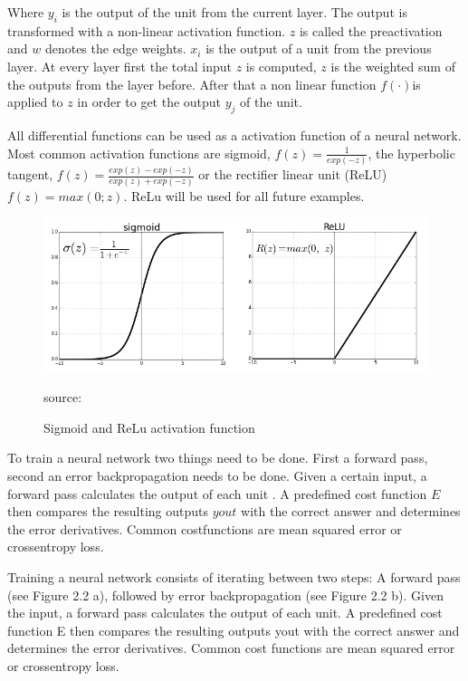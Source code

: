Where \( y_{i} \) is the output of the unit from the current layer. The output is transformed with a non-linear activation function. \(z\) is called the preactivation and \(w\) denotes the edge weights. \( x_{i} \) is the output of a unit from the previous layer. At every layer first the total input \(z\) is computed, \(z\) is the weighted sum of the outputs from the layer before. After that a non linear function \( f(\cdot) \)is applied to \(z\) in order to get the output \( y_{j} \) of the unit. 

All differential functions can be used as a activation function of a neural network. Most common activation functions are sigmoid,  \(f(z) = \frac{1}{exp(-z)}\), the hyperbolic tangent, \(f(z) = \frac{exp(z)-exp(-z)}{exp(z)+exp(-z)}\) or the rectifier linear unit (ReLU) \(f(z) = max(0; z)\). ReLu will be used for all future examples.


\begin{figure}[H]
	\centering
	\includegraphics[width=0.8\linewidth]{bilder/grundlagen/sigmoid.png}
	\caption{Sigmoid and ReLu activation function} source:\cite{Component}
	\label{fig:COMPONENT}
\end{figure}



To train a neural network two things need to be done. First a forward pass, second an error backpropagation needs to be done. 
Given a certain input, a forward pass calculates the output of each unit . A predefined cost function \(E\) then compares the resulting outputs \(yout\) with the correct answer and determines the error derivatives. Common costfunctions are mean squared error or crossentropy loss.


Training a neural network consists of iterating between two steps: A forward pass (see
Figure 2.2 a), followed by error backpropagation (see Figure 2.2 b). Given the input, a forward
pass calculates the output of each unit. A predefined cost function E then compares
the resulting outputs yout with the correct answer and determines the error derivatives.
Common cost functions are mean squared error or crossentropy loss.

